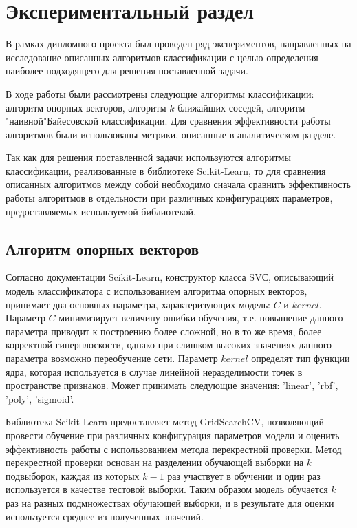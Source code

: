 \chapter{Экспериментальный раздел}
\label{cha:research}

В рамках дипломного проекта был проведен ряд экспериментов, направленных на исследование описанных алгоритмов классификации с целью определения наиболее подходящего для решения поставленной задачи.

В ходе работы были рассмотрены следующие алгоритмы классификации: алгоритм опорных векторов, алгоритм $k$-ближайших соседей, алгоритм "наивной"\space Байесовской классификации. Для сравнения эффективности работы алгоритмов были использованы метрики, описанные в аналитическом разделе. 

Так как для решения поставленной задачи используются алгоритмы классификации, реализованные в библиотеке Scikit-Learn, то для сравнения описанных алгоритмов между собой необходимо сначала сравнить эффективность работы алгоритмов в отдельности при различных конфигурациях параметров, предоставляемых используемой библиотекой.

\section{Алгоритм опорных векторов}
Согласно документации Scikit-Learn, конструктор класса SVС, описывающий модель классификатора с использованием алгоритма опорных векторов, принимает два основных параметра, характеризующих модель: $C$ и $kernel$. Параметр $C$ минимизирует величину ошибки обучения, т.е. повышение данного параметра приводит к построению более сложной, но в то же время, более корректной гиперплоскости, однако при слишком высоких значениях данного параметра возможно переобучение сети. 
Параметр $kernel$ определят тип функции ядра, которая используется в случае линейной неразделимости точек в пространстве признаков. Может принимать следующие значения: 'linear', 'rbf', 'poly', 'sigmoid'. 

Библиотека Scikit-Learn предоставляет метод GridSearchCV, позволяющий провести обучение при различных конфигурация параметров модели и оценить эффективность работы с использованием метода перекрестной проверки. Метод перекрестной проверки основан на разделении обучающей выборки на $k$ подвыборок, каждая из которых $k-1$ раз участвует в обучении и один раз используется в качестве тестовой выборки. Таким образом модель обучается $k$ раз на разных подмножествах обучающей выборки, и в результате для оценки используется среднее из полученных значений.

